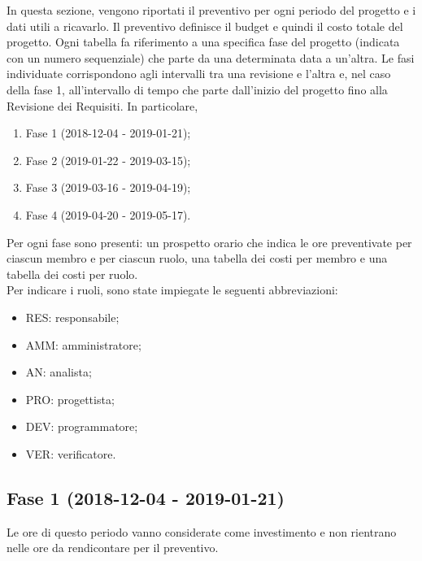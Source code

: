 In questa sezione, vengono riportati il preventivo per ogni periodo del progetto e i dati utili a ricavarlo. Il preventivo definisce il budget e quindi il costo totale del progetto. Ogni tabella fa riferimento a una specifica fase del progetto (indicata con un numero sequenziale) che parte da una determinata data a un'altra.
Le fasi individuate corrispondono agli intervalli tra una revisione e l'altra e, nel caso della fase 1, all'intervallo di tempo che parte dall'inizio del progetto fino alla Revisione dei Requisiti. In particolare,
\begin{enumerate}
	\item Fase 1 (2018-12-04 - 2019-01-21); 
	\item Fase 2 (2019-01-22 - 2019-03-15);
	\item Fase 3 (2019-03-16 - 2019-04-19);
	\item Fase 4 (2019-04-20 - 2019-05-17).
\end{enumerate}
Per ogni fase sono presenti: un prospetto orario che indica le ore preventivate per ciascun membro e per ciascun ruolo, una tabella dei costi per membro e una tabella dei costi per ruolo.\\
Per indicare i ruoli, sono state impiegate le seguenti abbreviazioni:
\begin{itemize}
	\item RES: responsabile;
	\item AMM: amministratore;
	\item AN: analista;
	\item PRO: progettista;
	\item DEV: programmatore;
	\item VER: verificatore.
\end{itemize}

\newpage
\subsection{Fase 1 (2018-12-04 - 2019-01-21)}
	Le ore di questo periodo vanno considerate come investimento e non rientrano nelle ore da rendicontare per il preventivo.
